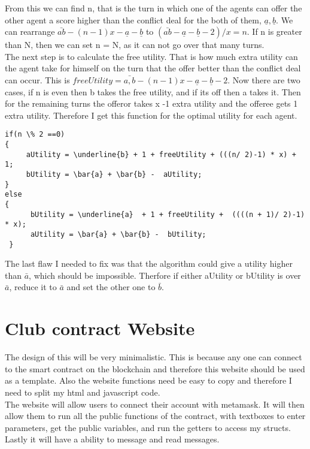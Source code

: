 From this we can find n, that is the turn in which one of the agents can offer the other agent a score higher than the conflict deal for the both of them, ${\underline{a},\underline{b}}$. We can rearrange $\bar{ab} - (n-1)x - \underline{a} - \underline{b}$ to $(\bar{ab} - \underline{a} - \underline{b} - 2) / x = n$. If n is greater than N, then we can set n = N, as it can not go over that many turns.
\\
The next step is to calculate the free utility. That is how much extra utility can the agent take for himself on the turn that the offer better than the conflict deal can occur. This is $freeUtility = \bar{a,b} - (n-1)x - \underline{a} - \underline{b} - 2$. Now there are two cases, if n is even then b takes the free utility, and if its off then a takes it. Then for the remaining turns the offeror takes x -1 extra utility and the offeree gets 1 extra utility. Therefore I get this function for the optimal utility for each agent.
\begin{lstlisting}
if(n \% 2 ==0)
{
     aUtility = \underline{b} + 1 + freeUtility + (((n/ 2)-1) * x) + 1;
     bUtility = \bar{a} + \bar{b} -  aUtility;
}
else
{
      bUtility = \underline{a}  + 1 + freeUtility +  ((((n + 1)/ 2)-1) * x);
      aUtility = \bar{a} + \bar{b} -  bUtility;
 }
\end{lstlisting}
The last flaw I needed to fix was that the algorithm could give a utility higher than $\bar{a}$, which should be impossible. Therfore if either aUtility or bUtility is over $\bar{a}$, reduce it to $\bar{a}$ and set the other one to $\bar{b}$.
\section{Club contract Website}
The design of this will be very minimalistic. This is because any one can connect to the smart contract on the blockchain and therefore this website should be used as a template. Also the website functions need be easy to copy and therefore I need to split my html and javascript code. \\
The website will allow users to connect their account with metamask. It will then allow them to run all the public functions of the contract, with textboxes to enter parameters, get the public variables, and run the getters to access my structs.  Lastly it will have a ability to message and read messages.








